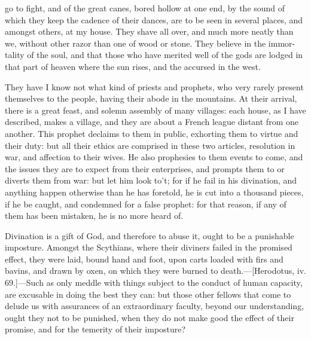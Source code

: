 \documentclass[twocolumn]{article}
\newcommand{\specialbreak}{\newpage\noindent}
\begin{document}
go to fight, and of the great canes, bored hollow at one end, by the sound of which they keep the cadence of their dances, are to be seen in several places, and amongst others, at my house. They shave all over, and much more neatly than we, without other razor than one of wood or stone. They believe in the immor-\specialbreak tality of the soul, and that those who have merited well of the gods are lodged in that part of heaven where the sun rises, and the accursed in the west.

	They have I know not what kind of priests and prophets, who very rarely present themselves to the people, having their abode in the mountains. At their arrival, there is a great feast, and solemn assembly of many villages: each house, as I have described, makes a village, and they are about a French league distant from one another. This prophet declaims to them in public, exhorting them to virtue and their duty: but all their ethics are comprised in these two articles, resolution in war, and affection to their wives. He also prophesies to them events to come, and the issues they are to expect from their enterprises, and prompts them to or diverts them from war: but let him look to’t; for if he fail in his divination, and anything happen otherwise than he has foretold, he is cut into a thousand pieces, if he be caught, and condemned for a false prophet: for that reason, if any of them has been mistaken, he is no more heard of.

	Divination is a gift of God, and therefore to abuse it, ought to be a punishable imposture. Amongst the Scythians, where their diviners failed in the promised effect, they were laid, bound hand and foot, upon carts loaded with firs and bavins, and drawn by oxen, on which they were burned to death.---[Herodotus, iv. 69.]---Such as only meddle with things subject to the conduct of human capacity, are excusable in doing the best they can: but those other fellows that come to delude us with assurances of an extraordinary faculty, beyond our understanding, ought they not to be punished, when they do not make good the effect of their promise, and for the temerity of their imposture?
\end{document}
